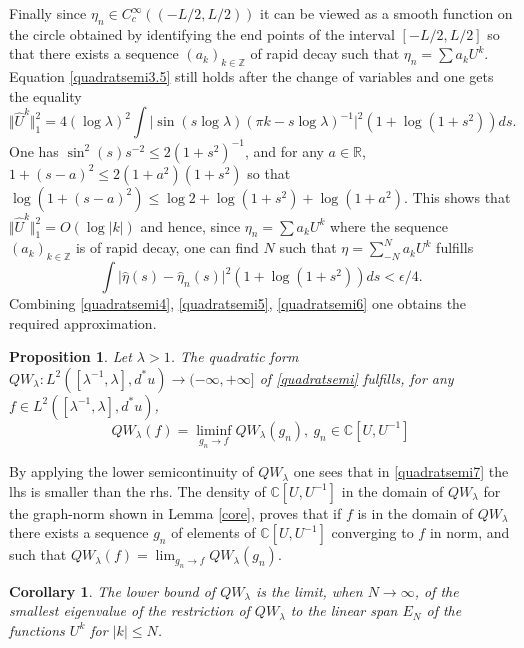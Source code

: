 \documentclass[cupthm]{CUP-JNL-JMJ}
\def\C{{\mathbb C}}
\def\R{{\mathbb R}}
\def\Z{{\mathbb Z}}
\numberwithin{equation}{section}
\theoremstyle{cupplain}
\newtheorem{corollary}[theorem]{Corollary}
\newtheorem{proposition}[theorem]{Proposition}
\theoremstyle{cupdefinition}
\theoremstyle{cupremark}
\theoremstyle{cupproof}
\begin{document}
Finally since $\eta_n\in C_c^{\infty}((-L/2,L/2))$ it can be viewed as a smooth function on the circle obtained by identifying the end points of the interval $[-L/2,L/2]$ so that there exists a sequence $(a_k)_{k\in \Z}$ of rapid decay such that $\eta_n=\sum a_k U^k$. Equation \eqref{quadratsemi3.5} still holds after the change of variables and one gets the equality
$$
\Vert{\widehat U^k}\Vert_1^2=4 (\log \lambda)^2 \int \vert\sin(s\log \lambda)\left(\pi k -s\log \lambda\right)^{-1}\vert^2(1+\log (1+s^2))ds.
$$
One has $\sin^2(s)s^{-2}\leq 2(1+s^2)^{-1}$, and for any $a\in \R$, $1+(s-a)^2\leq 2(1+a^2)(1+s^2)$ so that $\log(1+(s-a)^2)\leq \log 2 +\log (1+s^2)+ \log (1+a^2)$. This shows that $\Vert {\widehat U^k}\Vert_1^2=O(\log\vert k\vert)$ and hence, since $\eta_n=\sum a_k U^k$ where the sequence $(a_k)_{k\in \Z}$ is of rapid decay, one can find $N$ such that $\eta=\sum_{-N}^N a_k U^k$ fulfills
 \begin{equation}\label{quadratsemi6}
  \int\vert {\widehat \eta}(s)-{\widehat \eta_n}(s)\vert^2 (1+\log (1+s^2))ds<\epsilon/4.
\end{equation}
Combining \eqref{quadratsemi4}, \eqref{quadratsemi5}, \eqref{quadratsemi6} one obtains the
required approximation. \endproof 
\begin{proposition}\label{Hilbert1} Let $\lambda>1$. The  quadratic form $QW_\lambda:L^2([\lambda^{-1},\lambda],d^*u)\to (-\infty,+\infty]$ of \eqref{quadratsemi} fulfills, for any $f\in L^2([\lambda^{-1},\lambda],d^*u)$,	 
\begin{equation}\label{quadratsemi7}
 QW_\lambda(f)=\liminf_{g_n\to f} QW_\lambda(g_n), \ g_n\in \C[U,U^{-1}]
\end{equation}
\end{proposition}
\proof By applying the lower semicontinuity of $QW_\lambda$ one sees that in \eqref{quadratsemi7} the lhs is smaller than the rhs. The density of $\C[U,U^{-1}]$ in the domain of  $QW_\lambda$ for the graph-norm shown in Lemma \ref{core}, proves  that if $f$ is in the domain of  $QW_\lambda$ there exists a sequence $g_n$ of elements of  $\C[U,U^{-1}]$ converging to $f$ in norm, and such that $QW_\lambda(f)=\lim_{g_n\to f} QW_\lambda(g_n)$.\endproof 
\begin{corollary}\label{Hilbert2} The lower bound of $QW_\lambda$ is the limit, when $N\to \infty$, of the smallest eigenvalue of the restriction of $QW_\lambda$  to the linear span $E_N$ of the functions $U^k$ for $\vert k\vert \leq N$.	
\end{corollary}
\end{document}
